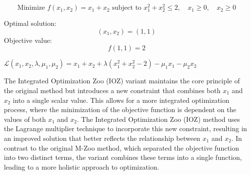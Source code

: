 \[
\text{Minimize } f(x_1, x_2) = x_1 + x_2 \text{ subject to } x_1^2 + x_2^2 \leq 2, \quad x_1 \geq 0, \quad x_2 \geq 0
\]

Optimal solution: 
\[
(x_1, x_2) = (1, 1)
\]
Objective value: 
\[
f(1, 1) = 2
\]


$\mathcal{L}(x_1, x_2, \lambda, \mu_1, \mu_2) = x_1 + x_2 + \lambda (x_1^2 + x_2^2 - 2) - \mu_1 x_1 - \mu_2 x_2$

The Integrated Optimization Zoo (IOZ) variant maintains the core principle of the original method but introduces a new constraint that combines both $x_1$ and $x_2$ into a single scalar value. This allows for a more integrated optimization process, where the minimization of the objective function is dependent on the values of both $x_1$ and $x_2$. The Integrated Optimization Zoo (IOZ) method uses the Lagrange multiplier technique to incorporate this new constraint, resulting in an improved solution that better reflects the relationship between $x_1$ and $x_2$. In contrast to the original M-Zoo method, which separated the objective function into two distinct terms, the variant combines these terms into a single function, leading to a more holistic approach to optimization.